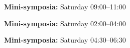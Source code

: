 \begin{center}
\label{mini-saturday1}
{\large {\bf Mini-symposia:} Saturday 09:00--11:00}
\end{center}
\vspace{1ex}

%




\begin{center}
\label{mini-saturday2}
{\large {\bf Mini-symposia:} Saturday 02:00--04:00}
\end{center}
\vspace{1ex}

%



\begin{center}
\label{mini-saturday3}
{\large {\bf Mini-symposia:} Saturday 04:30--06:30}
\end{center}
\vspace{1ex}

%
